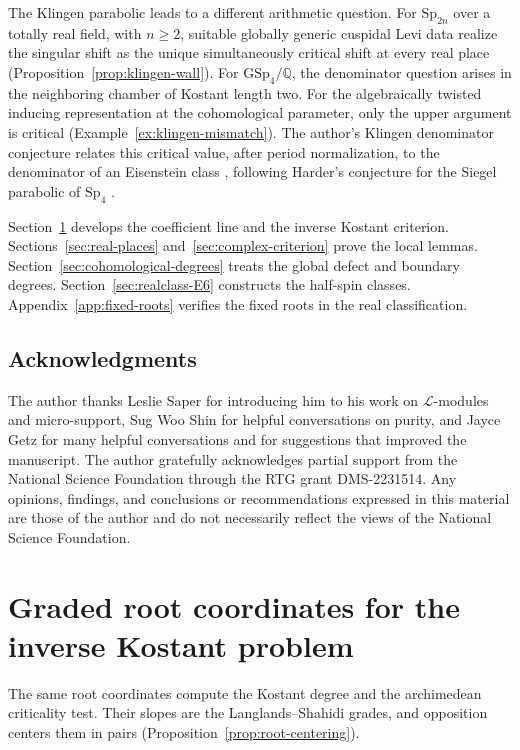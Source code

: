 \documentclass[12pt]{amsart}
\numberwithin{equation}{section}
\theoremstyle{plain}
\theoremstyle{definition}
\theoremstyle{remark}
\newcommand{\Sp}{\mathrm{Sp}}
\newcommand{\GSp}{\mathrm{GSp}}
\begin{document}
The Klingen parabolic leads to a different arithmetic question. For $\Sp_{2n}$ over a totally real field, with $n\ge2$, suitable globally generic cuspidal Levi data realize the singular shift as the unique simultaneously critical shift at every real place (Proposition~\ref{prop:klingen-wall}). For $\GSp_4/\mathbb Q$, the denominator question arises in the neighboring chamber of Kostant length two. For the algebraically twisted inducing representation at the cohomological parameter, only the upper argument is critical (Example~\ref{ex:klingen-mismatch}). The author's Klingen denominator conjecture relates this critical value, after period normalization, to the denominator of an Eisenstein class \cite{HosseiniJafariKlingen}, following Harder's conjecture for the Siegel parabolic of $\Sp_4$ \cite[\S1.5.1, (93)]{HarderDenominators}. 


Section~\ref{sec:root-setup} develops the coefficient line and the inverse Kostant criterion. Sections~\ref{sec:real-places} and~\ref{sec:complex-criterion} prove the local lemmas. Section~\ref{sec:cohomological-degrees} treats the global defect and boundary degrees. Section~\ref{sec:realclass-E6} constructs the half-spin classes. Appendix~\ref{app:fixed-roots} verifies the fixed roots in the real classification.

\subsection*{Acknowledgments} The author thanks Leslie Saper for introducing him to his work on $\mathcal L$-modules and micro-support, Sug Woo Shin for helpful conversations on purity, and Jayce Getz for many helpful conversations and for suggestions that improved the manuscript. The author gratefully acknowledges partial support from the National Science Foundation through the RTG grant DMS-2231514. Any opinions, findings, and conclusions or recommendations expressed in this material are those of the author and do not necessarily reflect the views of the National Science Foundation.

\section{Graded root coordinates for the inverse Kostant problem}\label{sec:root-setup}
The same root coordinates compute the Kostant degree and the archimedean criticality test. Their slopes are the Langlands--Shahidi grades, and opposition centers them in pairs (Proposition~\ref{prop:root-centering}).
\end{document}
